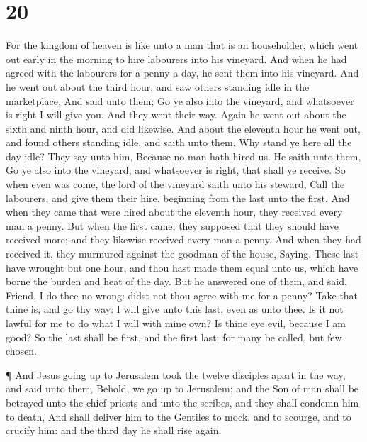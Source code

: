 \hypertarget{section-19}{%
\section{20}\label{section-19}}

 For the kingdom of heaven is like unto a man that is an
householder, which went out early in the morning to hire labourers into
his vineyard.  And when he had agreed with the labourers for
a penny a day, he sent them into his vineyard.  And he went
out about the third hour, and saw others standing idle in the
marketplace,  And said unto them; Go ye also into the
vineyard, and whatsoever is right I will give you. And they went their
way.  Again he went out about the sixth and ninth hour, and
did likewise.  And about the eleventh hour he went out, and
found others standing idle, and saith unto them, Why stand ye here all
the day idle?  They say unto him, Because no man hath hired
us. He saith unto them, Go ye also into the vineyard; and whatsoever is
right, that shall ye receive.  So when even was come, the
lord of the vineyard saith unto his steward, Call the labourers, and
give them their hire, beginning from the last unto the first.
 And when they came that were hired about the eleventh hour,
they received every man a penny.  But when the first came,
they supposed that they should have received more; and they likewise
received every man a penny.  And when they had received it,
they murmured against the goodman of the house,  Saying,
These last have wrought but one hour, and thou hast made them equal unto
us, which have borne the burden and heat of the day.  But
he answered one of them, and said, Friend, I do thee no wrong: didst not
thou agree with me for a penny?  Take that thine is, and go
thy way: I will give unto this last, even as unto thee.  Is
it not lawful for me to do what I will with mine own? Is thine eye evil,
because I am good?  So the last shall be first, and the
first last: for many be called, but few chosen.

 ¶ And Jesus going up to Jerusalem took the twelve
disciples apart in the way, and said unto them,  Behold, we
go up to Jerusalem; and the Son of man shall be betrayed unto the chief
priests and unto the scribes, and they shall condemn him to death,
 And shall deliver him to the Gentiles to mock, and to
scourge, and to crucify him: and the third day he shall rise again.

